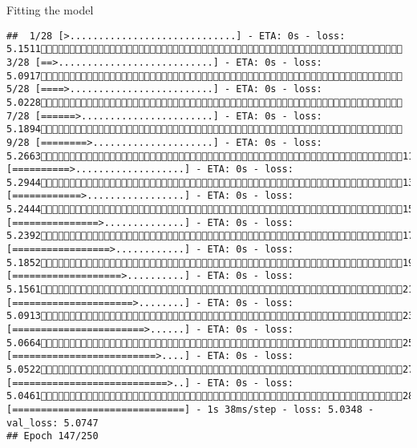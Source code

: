 \documentclass[
  ignorenonframetext,
]{beamer}
\begin{document}
\begin{frame}[fragile]{Fitting the model}
\begin{verbatim}
##  1/28 [>.............................] - ETA: 0s - loss: 5.1511 3/28 [==>...........................] - ETA: 0s - loss: 5.0917 5/28 [====>.........................] - ETA: 0s - loss: 5.0228 7/28 [======>.......................] - ETA: 0s - loss: 5.1894 9/28 [========>.....................] - ETA: 0s - loss: 5.266311/28 [==========>...................] - ETA: 0s - loss: 5.294413/28 [============>.................] - ETA: 0s - loss: 5.244415/28 [===============>..............] - ETA: 0s - loss: 5.239217/28 [=================>............] - ETA: 0s - loss: 5.185219/28 [===================>..........] - ETA: 0s - loss: 5.156121/28 [=====================>........] - ETA: 0s - loss: 5.091323/28 [=======================>......] - ETA: 0s - loss: 5.066425/28 [=========================>....] - ETA: 0s - loss: 5.052227/28 [===========================>..] - ETA: 0s - loss: 5.046128/28 [==============================] - 1s 38ms/step - loss: 5.0348 - val_loss: 5.0747
## Epoch 147/250

\end{verbatim}
\end{frame}
\end{document}
